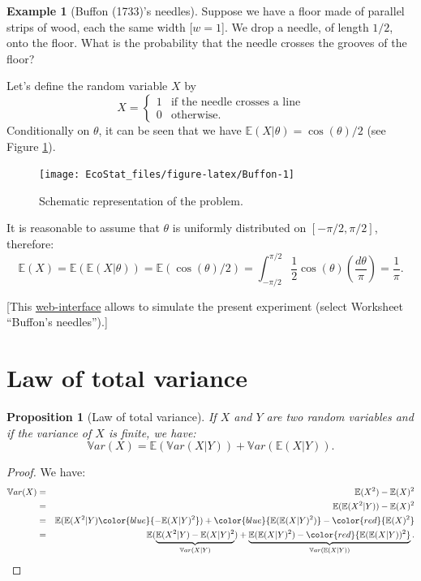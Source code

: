 \documentclass[
  12pt,
]{book}
\newtheorem{proposition}{Proposition}[chapter]
\theoremstyle{definition}
\theoremstyle{definition}
\newtheorem{example}{Example}[chapter]
\theoremstyle{definition}
\theoremstyle{definition}
\theoremstyle{remark}
\begin{document}
\begin{example}[Buffon (1733)'s needles]
\protect\hypertarget{exm:Buffon}{}\label{exm:Buffon}Suppose we have a floor made of parallel strips of wood, each the same width {[}\(w=1\){]}. We drop a needle, of length \(1/2\), onto the floor. What is the probability that the needle crosses the grooves of the floor?

Let's define the random variable \(X\) by
\[
X = \left\{
\begin{array}{cl}
1 & \mbox{if the needle crosses a line}\\
0 & \mbox{otherwise.}
\end{array}
\right.
\]
Conditionally on \(\theta\), it can be seen that we have \(\mathbb{E}(X|\theta)=\cos(\theta)/2\) (see Figure \ref{fig:Buffon}).

\begin{figure}
\texttt{[image: EcoStat\_files/figure-latex/Buffon-1]} \caption{Schematic representation of the problem.}\label{fig:Buffon}
\end{figure}

It is reasonable to assume that \(\theta\) is uniformly distributed on \([-\pi/2,\pi/2]\), therefore:
\[
\mathbb{E}(X)=\mathbb{E}(\mathbb{E}(X|\theta))=\mathbb{E}(\cos(\theta)/2)=\int_{-\pi/2}^{\pi/2}\frac{1}{2}\cos(\theta)\left(\frac{d\theta}{\pi}\right)=\frac{1}{\pi}.
\]

{[}This \href{https://jrenne.shinyapps.io/StatEcoII/}{web-interface} allows to simulate the present experiment (select Worksheet ``Buffon's needles'').{]}
\end{example}

\hypertarget{law-of-total-variance}{%
\section{Law of total variance}\label{law-of-total-variance}}

\begin{proposition}[Law of total variance]
\protect\hypertarget{prp:lawtotalvariance}{}\label{prp:lawtotalvariance}If \(X\) and \(Y\) are two random variables and if the variance of \(X\) is finite, we have:
\[
\boxed{\mathbb{V}ar(X) = \mathbb{E}(\mathbb{V}ar(X|Y)) + \mathbb{V}ar(\mathbb{E}(X|Y)).}
\]
\end{proposition}

\begin{proof}
We have:
\begin{eqnarray*}
\mathbb{V}ar(X) &=& \mathbb{E}(X^2) - \mathbb{E}(X)^2\\
&=& \mathbb{E}(\mathbb{E}(X^2|Y)) - \mathbb{E}(X)^2\\
&=& \mathbb{E}(\mathbb{E}(X^2|Y) \color{blue}{- \mathbb{E}(X|Y)^2}) +  \color{blue}{\mathbb{E}(\mathbb{E}(X|Y)^2)}  - \color{red}{\mathbb{E}(X)^2}\\
&=& \mathbb{E}(\underbrace{\mathbb{E}(X^2|Y) - \mathbb{E}(X|Y)^2}_{\mathbb{V}ar(X|Y)}) + \underbrace{\mathbb{E}(\mathbb{E}(X|Y)^2) - \color{red}{\mathbb{E}(\mathbb{E}(X|Y))^2}}_{\mathbb{V}ar(\mathbb{E}(X|Y))}.
\end{eqnarray*}
\end{proof}
\end{document}
